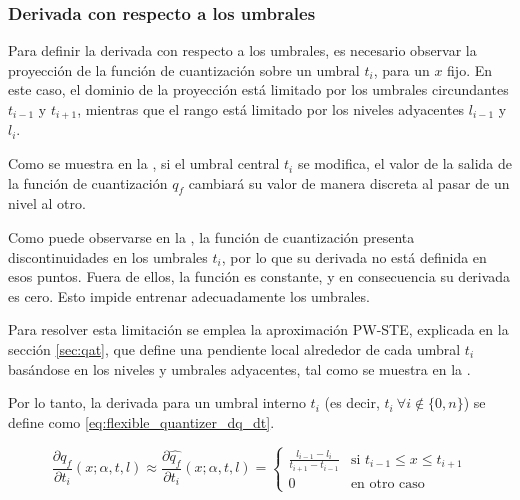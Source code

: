 \subsubsection{Derivada con respecto a los umbrales}
Para definir la derivada con respecto a los umbrales, es necesario observar la proyección de la función de cuantización sobre un umbral $t_i$, para un $x$ fijo. En este caso, el dominio de la proyección está limitado por los umbrales circundantes $t_{i-1}$ y $t_{i+1}$, mientras que el rango está limitado por los niveles adyacentes $l_{i-1}$ y $l_i$.

Como se muestra en la , si el umbral central $t_i$ se modifica, el valor de la salida de la función de cuantización $q_f$ cambiará su valor de manera discreta al pasar de un nivel al otro.


Como puede observarse en la , la función de cuantización presenta discontinuidades en los umbrales $t_i$, por lo que su derivada no está definida en esos puntos. Fuera de ellos, la función es constante, y en consecuencia su derivada es cero. Esto impide entrenar adecuadamente los umbrales.

Para resolver esta limitación se emplea la aproximación PW-STE, explicada en la sección \ref{sec:qat}, que define una pendiente local alrededor de cada umbral $t_i$ basándose en los niveles y umbrales adyacentes, tal como se muestra en la .


Por lo tanto, la derivada para un umbral interno $t_i$ (es decir,  $t_i~\forall i \notin \{0, n\}$) se define como \eqref{eq:flexible_quantizer_dq_dt}.

\begin{equation}
\label{eq:flexible_quantizer_dq_dt}
\frac{\partial q_f}{\partial t_i} \left(x; \alpha, t, l\right) \approx \frac{\partial \hat{q_f}}{\partial t_i} \left(x; \alpha, t, l\right)=
\begin{cases}
    \frac{l_{i-1} - l_i}{t_{i+1} - t_{i-1}} & \text{si } t_{i-1} \leq x \leq t_{i+1} \\
    0 & \text{en otro caso}
\end{cases}
\end{equation}

